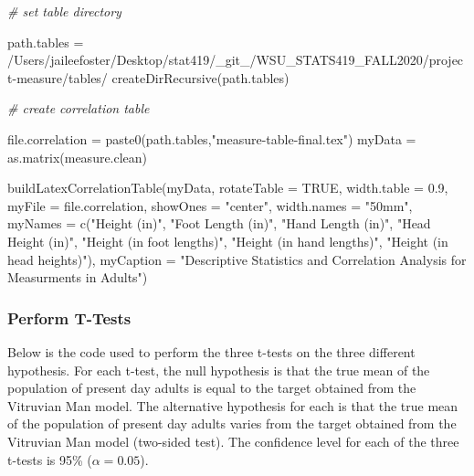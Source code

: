 \documentclass[]{article}
\newenvironment{Shaded}{\begin{snugshade}}{\end{snugshade}}
\newcommand{\AttributeTok}[1]{\textcolor[rgb]{0.77,0.63,0.00}{#1}}
\newcommand{\CommentTok}[1]{\textcolor[rgb]{0.56,0.35,0.01}{\textit{#1}}}
\newcommand{\ConstantTok}[1]{\textcolor[rgb]{0.00,0.00,0.00}{#1}}
\newcommand{\FloatTok}[1]{\textcolor[rgb]{0.00,0.00,0.81}{#1}}
\newcommand{\FunctionTok}[1]{\textcolor[rgb]{0.00,0.00,0.00}{#1}}
\newcommand{\NormalTok}[1]{#1}
\newcommand{\OtherTok}[1]{\textcolor[rgb]{0.56,0.35,0.01}{#1}}
\newcommand{\StringTok}[1]{\textcolor[rgb]{0.31,0.60,0.02}{#1}}
\begin{document}
\begin{Shaded}
\begin{Highlighting}[]
\CommentTok{\# set table directory}

\NormalTok{path.tables }\OtherTok{=} \StringTok{\textquotesingle{}/Users/jaileefoster/Desktop/stat419/\_git\_/WSU\_STATS419\_FALL2020/project{-}measure/tables/\textquotesingle{}}
\FunctionTok{createDirRecursive}\NormalTok{(path.tables)}

\CommentTok{\# create correlation table}

\NormalTok{file.correlation }\OtherTok{=} \FunctionTok{paste0}\NormalTok{(path.tables,}\StringTok{"measure{-}table{-}final.tex"}\NormalTok{) }
\NormalTok{myData }\OtherTok{=} \FunctionTok{as.matrix}\NormalTok{(measure.clean)}

\FunctionTok{buildLatexCorrelationTable}\NormalTok{(myData, }
                           \AttributeTok{rotateTable =} \ConstantTok{TRUE}\NormalTok{, }
                           \AttributeTok{width.table =} \FloatTok{0.9}\NormalTok{, }
                           \AttributeTok{myFile =}\NormalTok{ file.correlation, }
                           \AttributeTok{showOnes =} \StringTok{"center"}\NormalTok{,}
                           \AttributeTok{width.names =} \StringTok{"50mm"}\NormalTok{,}
                           \AttributeTok{myNames =} \FunctionTok{c}\NormalTok{(}\StringTok{"Height (in)"}\NormalTok{, }\StringTok{"Foot Length (in)"}\NormalTok{, }
                                       \StringTok{"Hand Length (in)"}\NormalTok{, }\StringTok{"Head Height (in)"}\NormalTok{, }
                                       \StringTok{"Height (in foot lengths)"}\NormalTok{, }
                                       \StringTok{"Height (in hand lengths)"}\NormalTok{, }
                                       \StringTok{"Height (in head heights)"}\NormalTok{), }
                           \AttributeTok{myCaption =} \StringTok{"Descriptive Statistics and Correlation Analysis }
\StringTok{                                        for Measurments in Adults"}\NormalTok{)}
\end{Highlighting}
\end{Shaded}

\subsubsection{Perform T-Tests}

Below is the code used to perform the three t-tests on the three
different hypothesis. For each t-test, the null hypothesis is that the
true mean of the population of present day adults is equal to the target
obtained from the Vitruvian Man model. The alternative hypothesis for
each is that the true mean of the population of present day adults
varies from the target obtained from the Vitruvian Man model (two-sided
test). The confidence level for each of the three t-tests is 95\%
(\(\alpha = 0.05\)).
\end{document}
